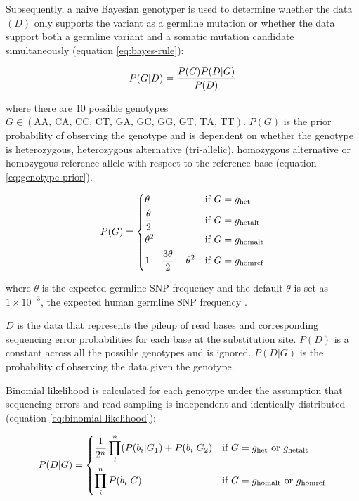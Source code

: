 Subsequently, a naive Bayesian genotyper is used to determine whether the data $(D)$ only supports the variant as a germline mutation or whether the data support both a germline variant and a somatic mutation candidate simultaneously (equation \ref{eq:bayes-rule}):

\begin{equation} \label{eq:bayes-rule}
P(G|D) = \frac{P(G)P(D|G)}{P(D)} \smallskip
\end{equation}

where there are 10 possible genotypes $G \in (\text{AA, CA, CC, CT, GA, GC, GG, GT, TA, TT})$. $P(G)$ is the prior probability of observing the genotype and is dependent on whether the genotype is heterozygous, heterozygous alternative (tri-allelic), homozygous alternative or homozygous reference allele with respect to the reference base (equation \ref{eq:genotype-prior}).  

\begin{equation} \label{eq:genotype-prior}
 P(G)= 
 	\begin{dcases}
    	\theta & \text{if } G = g_{\text{het}} \\
	    \frac{\theta}{2} & \text{if } G = g_{\text{hetalt}} \\
		\theta^{2} & \text{if } G = g_{\text{homalt}} \\
		1 - \frac{3\theta}{2} - \theta^{2} & \text{if } G = g_{\text{homref}} \\
	\end{dcases} \smallskip
\end{equation}

where $\theta$ is the expected germline SNP frequency and the default $\theta$ is set as $1\times10^{-3}$, the expected human germline SNP frequency \cite{1000_Genomes_Project_Consortium2012-rj}. 

$D$ is the data that represents the pileup of read bases and corresponding sequencing error probabilities for each base at the substitution site. $P(D)$ is a constant across all the possible genotypes and is ignored. $P(D|G)$ is the probability of observing the data given the genotype. 

Binomial likelihood is calculated for each genotype under the assumption that sequencing errors and read sampling is independent and identically distributed (equation \ref{eq:binomial-likelihood}):

\begin{equation} \label{eq:binomial-likelihood}
P(D|G) =  
	\begin{dcases}
    	\frac{1}{2^n}\prod_{i}^{n} (P(b_{i}|G_1) + P(b_{i}|G_2) & \text{if } G = g_{\text{het}} \text{ or } g_{\text{hetalt}} \\
	    \prod_{i}^{n} P(b_{i}|G) & \text{if } G = g_{\text{homalt}} \text{ or } g_{\text{homref}} \\
	\end{dcases}
\end{equation}

